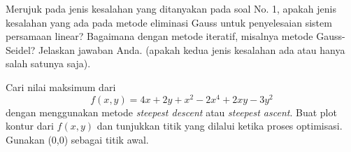 \begin{soal}
Merujuk pada jenis kesalahan yang ditanyakan pada soal No. 1, apakah jenis kesalahan
yang ada pada metode eliminasi Gauss untuk penyelesaian sistem persamaan linear?
Bagaimana dengan metode iteratif, misalnya metode Gauss-Seidel? Jelaskan jawaban Anda.
(apakah kedua jenis kesalahan ada atau hanya salah satunya saja).
\end{soal}



\begin{soal}
Cari nilai maksimum dari
\begin{equation*}
f(x,y) = 4x + 2y + x^2 - 2x^4 + 2xy - 3y^2
\end{equation*}
dengan menggunakan metode \textit{steepest descent} atau \textit{steepest ascent}.
Buat plot kontur
dari $f(x,y)$ dan tunjukkan titik yang dilalui ketika proses optimisasi.
Gunakan (0,0) sebagai titik awal.
\end{soal}



